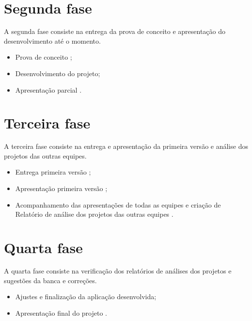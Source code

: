 \section{Segunda fase}
A segunda fase consiste na entrega da prova de conceito e apresentação do desenvolvimento até o momento.

\begin{itemize}
    \item Prova de conceito ;
    
    \item Desenvolvimento do projeto;
    
    \item Apresentação parcial .
\end{itemize}

\section{Terceira fase}
A terceira fase consiste na entrega e apresentação da primeira versão e análise dos projetos das outras equipes.

\begin{itemize}
    \item Entrega primeira versão ;

    \item Apresentação primeira versão ;
    
    \item Acompanhamento das apresentações de todas as equipes e criação de Relatório de análise dos projetos das outras equipes .
\end{itemize}


\section{Quarta fase}
A quarta fase consiste na verificação dos relatórios de análises dos projetos e sugestões da banca e correções.

\begin{itemize}
    \item Ajustes e finalização da aplicação desenvolvida;
    
    \item Apresentação final do projeto .
    
\end{itemize}

